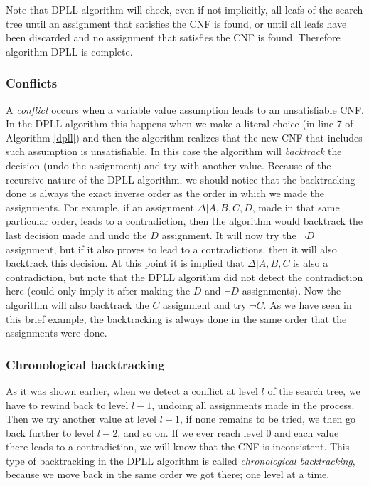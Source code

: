 \documentclass[12pt]{diicc}
\begin{document}
Note that DPLL algorithm will check, even if not implicitly, all leafs of the search tree until an assignment that satisfies the CNF is found, or until all leafs have been discarded and no assignment that satisfies the CNF is found. Therefore algorithm DPLL is complete.

\subsubsection{Conflicts}

A \textit{conflict} occurs when a variable value assumption leads to an unsatisfiable CNF. In the DPLL algorithm this happens when we make a literal choice (in line 7 of Algorithm \ref{dpll}) and then the algorithm realizes that the new CNF that includes such assumption is unsatisfiable. In this case the algorithm will \textit{backtrack} the decision (undo the assignment) and try with another value. Because of the recursive nature of the DPLL algorithm, we should notice that the backtracking done is always the exact inverse order as the order in which we made the assignments. For example, if an assignment $\Delta | A,B,C,D$, made in that same particular order, leads to a contradiction, then the algorithm would backtrack the last decision made and undo the $D$ assignment. It will now try the $\neg D$ assignment, but if it also proves to lead to a contradictions, then it will also backtrack this decision. At this point it is implied that $\Delta | A,B,C$ is also a contradiction, but note that the DPLL algorithm did not detect the contradiction here (could only imply it after making the $D$ and $\neg D$ assignments). Now the algorithm will also backtrack the $C$ assignment and try $\neg C$. As we have seen in this brief example, the backtracking is always done in the same order that the assignments were done.

\subsubsection{Chronological backtracking}

As it was shown earlier, when we detect a conflict at level $l$ of the search tree, we have to rewind back to level $l-1$, undoing all assignments made in the process. Then we try another value at level $l-1$, if none remains  to be tried, we then go back further to level $l-2$, and so on. If we ever reach level $0$ and each value there leads to a contradiction, we will know that the CNF is inconsistent. This type of backtracking in the DPLL algorithm is called \textit{chronological backtracking}, because we move back in the same order we got there; one level at a time. 
\end{document}
